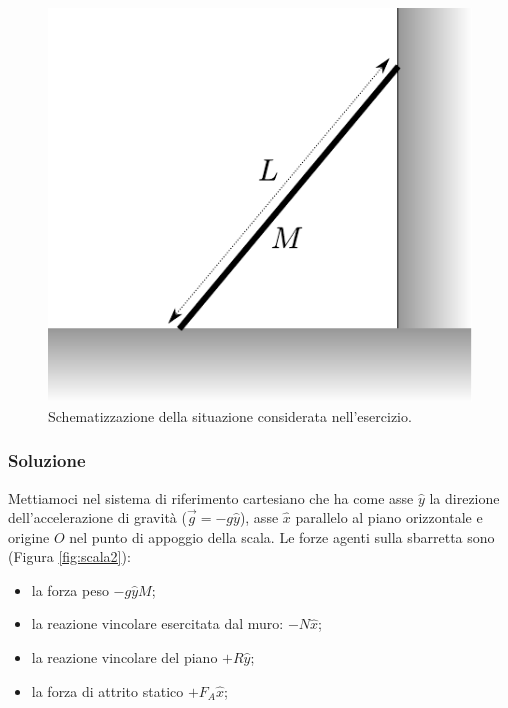 \documentclass[12pt,a4paper]{book}
\begin{document}
\begin{figure}[!ht]
 \centering
\includegraphics[scale=1]{scala1.pdf}
\caption{Schematizzazione della situazione considerata nell'esercizio. \label{fig:scala1} }
\end{figure}

\subsubsection*{Soluzione}
Mettiamoci nel sistema di riferimento cartesiano che ha come asse $\hat{y}$ la direzione dell'accelerazione di gravità
($\vec{g}=-g\hat{y}$), asse $\hat{x}$ parallelo al piano orizzontale e origine $O$ nel punto di appoggio della scala.
Le forze agenti sulla sbarretta sono (Figura \ref{fig:scala2}):
\begin{itemize}
\item la forza peso $-g\hat{y}M$;
\item la reazione vincolare esercitata dal muro: $-N\hat{x}$;
\item la reazione vincolare del piano $+R\hat{y}$;
\item la forza di attrito statico $+F_A \hat{x}$;
\end{itemize}
\end{document}
